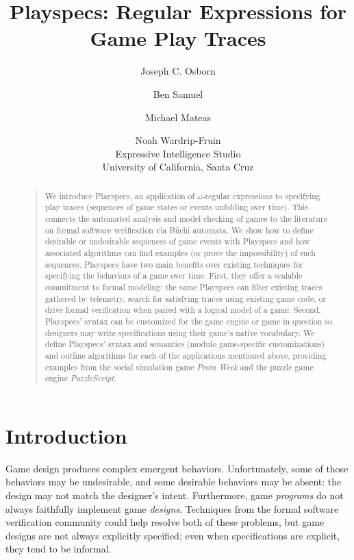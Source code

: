 \documentclass[letterpaper]{article}
\title{Playspecs: Regular Expressions for Game Play Traces}
\author{Joseph C. Osborn \and Ben Samuel \and Michael Mateas \and Noah Wardrip-Fruin\\
Expressive Intelligence Studio\\
University of California, Santa Cruz
}
\begin{document}
\maketitle
\begin{abstract}
\begin{quote}

We introduce Playspecs, an application of $\omega$-regular expressions to specifying play traces (sequences of game states or events unfolding over time). This connects the automated analysis and model checking of games to the literature on formal software verification via B\"{u}chi automata. We show how to define desirable or undesirable sequences of game events with Playspecs and how associated algorithms can find examples (or prove the impossibility) of such sequences. Playspecs have two main benefits over existing techniques for specifying the behaviors of a game over time. First, they offer a scalable commitment to formal modeling: the same Playspecs can filter existing traces gathered by telemetry, search for satisfying traces using existing game code, or drive formal verification when paired with a logical model of a game. Second, Playspecs' syntax can be customized for the game engine or game in question so designers may write specifications using their game's native vocabulary. We define Playspecs' syntax and semantics (modulo game-specific customizations) and outline algorithms for each of the applications mentioned above, providing examples from the social simulation game \emph{Prom Week} and the puzzle game engine \emph{PuzzleScript}.

\end{quote}
\end{abstract}

\section{Introduction}
\label{sec:introduction}

\noindent Game design produces complex emergent behaviors. Unfortunately, some of those behaviors may be undesirable, and some desirable behaviors may be absent: the design may not match the designer's intent. Furthermore, game \emph{programs} do not always faithfully implement game \emph{designs}. Techniques from the formal software verification community could help resolve both of these problems, but game designs are not always explicitly specified; even when specifications are explicit, they tend to be informal.
\end{document}
